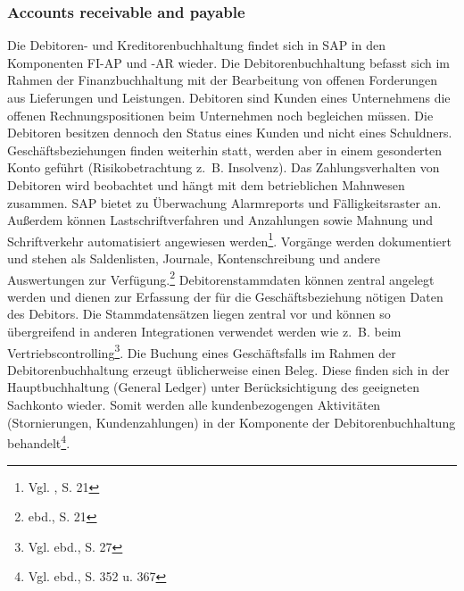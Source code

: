 \subsubsection{Accounts receivable and payable} 
Die Debitoren- und Kreditorenbuchhaltung findet sich in SAP in den Komponenten FI-AP und -AR wieder.
Die Debitorenbuchhaltung befasst sich im Rahmen der Finanzbuchhaltung mit der Bearbeitung von offenen Forderungen aus Lieferungen und Leistungen. Debitoren sind Kunden eines Unternehmens die offenen Rechnungspositionen beim Unternehmen noch begleichen müssen. Die Debitoren besitzen dennoch den Status eines Kunden und nicht eines Schuldners. Geschäftsbeziehungen finden weiterhin statt, werden aber in einem gesonderten Konto geführt (Risikobetrachtung z.~B. Insolvenz). Das Zahlungsverhalten von Debitoren wird beobachtet und hängt mit dem betrieblichen Mahnwesen zusammen. SAP bietet zu Überwachung Alarmreports und Fälligkeitsraster an. Außerdem können Lastschriftverfahren und Anzahlungen sowie Mahnung und Schriftverkehr automatisiert angewiesen werden\footnote{Vgl. \cite{SAPFIAPAR2001}, S. 21}. \glqq Vorgänge werden dokumentiert und stehen als Saldenlisten, Journale, Kontenschreibung und andere Auswertungen zur Verfügung.\grqq \footnote{ebd., S. 21} Debitorenstammdaten können zentral angelegt werden und dienen zur Erfassung der für die Geschäftsbeziehung nötigen Daten des Debitors. Die Stammdatensätzen liegen zentral vor und können so übergreifend in anderen Integrationen verwendet werden wie z.~B. beim Vertriebscontrolling\footnote{Vgl. ebd., S. 27}. Die Buchung eines Geschäftsfalls im Rahmen der Debitorenbuchhaltung erzeugt üblicherweise einen Beleg. Diese finden sich in der Hauptbuchhaltung (General Ledger) unter Berücksichtigung des geeigneten Sachkonto wieder. Somit werden alle kundenbezogengen Aktivitäten (Stornierungen, Kundenzahlungen) in der Komponente der Debitorenbuchhaltung behandelt\footnote{Vgl. ebd., S. 352 u. 367}.

